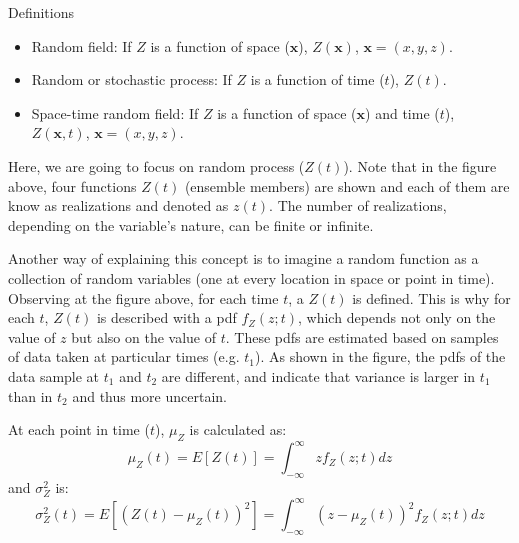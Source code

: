 \documentclass[8pt]{beamer}
\renewcommand{\emph}[1]{\textcolor{myorange}{#1}}
\begin{document}
\begin{frame}{Definitions}
    \begin{itemize}
        \item \alert{Random field}: If $Z$ is a function of space ($\mathbf{x}$), $Z(\mathbf{x})$, $\mathbf{x}= (x,y, z)$. 
        \item \alert{Random or stochastic process}: If $Z$ is a function of time ($t$), $Z(t)$.
        \item \alert{Space-time random field}: If $Z$ is a function of space ($\mathbf{x}$) and time ($t$), $Z(\mathbf{x},t)$, $\mathbf{x}= (x,y, z)$.
   \end{itemize}
   Here, we are going to focus on \emph{random process} ($Z(t)$). Note that in the figure above, four functions $Z(t)$ (\emph{ensemble members}) are shown and each of them are know as \emph{realizations} and denoted as $z(t)$. The number of \emph{realizations}, depending on the variable's nature, can be finite or infinite.

   Another way of explaining this concept is to imagine a \emph{random function} as a collection of \emph{random variables} (one at every location in space or point in time). Observing at the figure above, for each time $t$, a $Z(t)$ is defined. This is why for each $t$, $Z(t)$ is described with a \emph{pdf} $f_Z (z; t)$, which depends not only on the value of $z$ but also on the value of $t$. These \emph{pdf}s are estimated based on samples of data taken at particular times (e.g. $t_1$). As shown in the figure, the \emph{pdf}s of the data sample at $t_1$ and $t_2$ are different, and indicate that variance is larger in $t_1$ than in $t_2$ and thus more uncertain.

   At each point in time ($t$), $\mu_Z$ is calculated as:
   \[
       \mu_Z (t) = E[Z(t)] = \int_{-\infty}^{\infty} z f_Z (z; t) dz
   \]
   and $\sigma_Z^2$ is:
   \[
       \sigma_Z^2 (t) = E[(Z(t)-\mu_Z (t))^2] = \int_{-\infty}^{\infty} (z-\mu_Z (t))^2 f_Z (z; t) dz
   \]

\end{frame}
\end{document}

